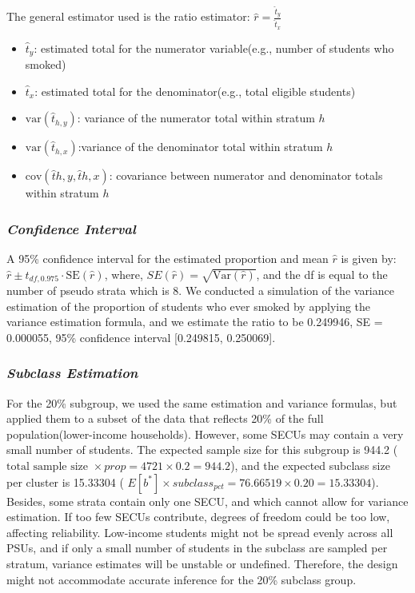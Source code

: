 \documentclass[
  12pt]{article}
\begin{document}
The general estimator used is the ratio estimator:
\(\hat{r} = \frac{\hat{t}_y}{\hat{t}_x}\)

\begin{itemize}
\item
  \(\hat{t}_y\): estimated total for the numerator variable(e.g., number
  of students who smoked)
\item
  \(\hat{t}_x\): estimated total for the denominator(e.g., total
  eligible students)
\item
  \(\text{var}(\hat{t}_{h,y})\): variance of the numerator total within
  stratum \(h\)
\item
  \(\text{var}(\hat{t}_{h,x})\):variance of the denominator total within
  stratum \(h\)
\item
  \(\text{cov}(\hat{t}{h,y}, \hat{t}{h,x})\): covariance between
  numerator and denominator totals within stratum \(h\)
\end{itemize}

\subsubsection{\texorpdfstring{\emph{Confidence
Interval}}{Confidence Interval}}\label{confidence-interval}

A 95\% confidence interval for the estimated proportion and mean
\(\hat{r}\) is given by:
\(\hat{r} \pm t_{df, 0.975} \cdot \text{SE}(\hat{r})\), where,
\(SE(\hat{r}) = \sqrt{\text{Var}(\hat{r})}\), and the df is equal to the
number of pseudo strata which is 8. We conducted a simulation of the
variance estimation of the proportion of students who ever smoked by
applying the variance estimation formula, and we estimate the ratio to
be 0.249946, SE = 0.000055, 95\% confidence interval {[}0.249815,
0.250069{]}.

\subsubsection{\texorpdfstring{\emph{Subclass
Estimation}}{Subclass Estimation}}\label{subclass-estimation}

For the 20\% subgroup, we used the same estimation and variance
formulas, but applied them to a subset of the data that reflects 20\% of
the full population(lower-income households). However, some SECUs may
contain a very small number of students. The expected sample size for
this subgroup is 944.2
(\(\text{total sample size } \times prop = 4721 \times 0.2 = 944.2\)),
and the expected subclass size per cluster is 15.33304 (
\(E[b^{*}] \times subclass_{pct} = 76.66519 \times 0.20 = 15.33304\)).
Besides, some strata contain only one SECU, and which cannot allow for
variance estimation. If too few SECUs contribute, degrees of freedom
could be too low, affecting reliability. Low-income students might not
be spread evenly across all PSUs, and if only a small number of students
in the subclass are sampled per stratum, variance estimates will be
unstable or undefined. Therefore, the design might not accommodate
accurate inference for the 20\% subclass group.
\end{document}
